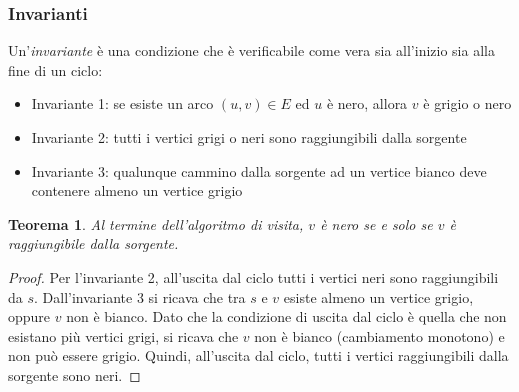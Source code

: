 \documentclass[11pt]{book}
\newtheorem*{theorem}{Teorema}
\begin{document}
\subsubsection{Invarianti}
Un'\textit{invariante} è una condizione che è verificabile come vera sia all'inizio sia alla fine di un ciclo:
\begin{itemize}
    \item Invariante 1: se esiste un arco $(u,v)\in E$ ed $u$ è nero, allora $v$ è grigio o nero 
    \item Invariante 2: tutti i vertici grigi o neri sono raggiungibili dalla sorgente 
    \item Invariante 3: qualunque cammino dalla sorgente ad un vertice bianco deve contenere almeno un vertice grigio 
\end{itemize}
\begin{theorem}
    Al termine dell'algoritmo di visita, $v$ è nero se e solo se $v$ è raggiungibile dalla sorgente.
\end{theorem}
\begin{proof}
    Per l'invariante 2, all'uscita dal ciclo tutti i vertici neri sono raggiungibili da $s$. Dall'invariante 
    3 si ricava che tra $s$ e $v$ esiste almeno un vertice grigio, oppure $v$ non è bianco. Dato che la condizione di uscita 
    dal ciclo è quella che non esistano più vertici grigi, si ricava che $v$ non è bianco (cambiamento monotono) e non può 
    essere grigio. Quindi, all'uscita dal ciclo, tutti i vertici raggiungibili dalla sorgente sono neri.
\end{proof}
\end{document}

